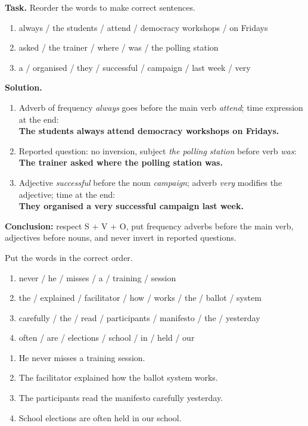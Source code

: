 \documentclass[11pt]{article}
\begin{document}
\begin{exoresolu}
\textbf{Task.} Reorder the words to make correct sentences.
\begin{enumerate}
\item always / the students / attend / democracy workshops / on Fridays
\item asked / the trainer / where / was / the polling station
\item a / organised / they / successful / campaign / last week / very
\end{enumerate}
\tcblower
\textbf{Solution.}
\begin{enumerate}
\item Adverb of frequency \emph{always} goes before the main verb \emph{attend}; time expression at the end: \\
\textbf{The students always attend democracy workshops on Fridays.}
\item Reported question: no inversion, subject \emph{the polling station} before verb \emph{was}: \\
\textbf{The trainer asked where the polling station was.}
\item Adjective \emph{successful} before the noun \emph{campaign}; adverb \emph{very} modifies the adjective; time at the end: \\
\textbf{They organised a very successful campaign last week.}
\end{enumerate}
\textbf{Conclusion:} respect S + V + O, put frequency adverbs before the main verb, adjectives before nouns, and never invert in reported questions.
\end{exoresolu}

\begin{exercice}
Put the words in the correct order.
\begin{enumerate}
\item never / he / misses / a / training / session
\item the / explained / facilitator / how / works / the / ballot / system
\item carefully / the / read / participants / manifesto / the / yesterday
\item often / are / elections / school / in / held / our
\end{enumerate}
\end{exercice}

\begin{corrige}
\begin{enumerate}
\item He never misses a training session.
\item The facilitator explained how the ballot system works.
\item The participants read the manifesto carefully yesterday.
\item School elections are often held in our school.
\end{enumerate}
\end{corrige}
\end{document}
